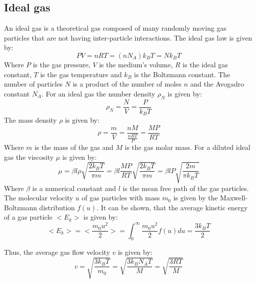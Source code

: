 \documentclass[\main/master.tex]{subfiles}
\begin{document}
\subsection{Ideal gas}
An ideal gas is a theoretical gas composed of many randomly moving gas particles that are not having inter-particle interactions. The ideal gas law is given by:
\begin{equation}
PV = nRT = (n N_A) k_B T = N k_B T  \label{eqn:ideal-gasses}
\end{equation}
Where $P$ is the gas pressure, $V$ is the medium's volume, $R$ is the ideal gas constant, $T$ is the gas temperature and $k_B$ is the Boltzmann constant. The number of particles $N$ is a product of the number of moles $n$ and the Avogadro constant $N_A$. For an ideal gas the number density $\rho_N$ is given by:
\begin{equation}
\rho_N = \frac{N}{V}= \frac{P}{k_B T}    \label{eqn:ideal number density}
\end{equation}
The mass density $\rho$ is given by:
\begin{equation}
\rho = \frac{m}{V}=\frac{n M}{\frac{n R T}{P}}=\frac{MP}{RT}     \label{eqn:ideal density}
\end{equation}
Where $m$ is the mass of the gas and $M$ is the gas molar mass. For a diluted ideal gas the viscosity $\mu$ is given by:
\begin{equation}
\mu = \beta l \rho \sqrt{\frac{2 k_B  T}{\pi m}}  =  \beta l \frac{MP}{RT} \sqrt{\frac{2 k_B  T}{\pi m}} =  \beta l P \sqrt{\frac{2 m  }{\pi k_B T}}     \label{eqn:viscosity}
\end{equation}
Where $\beta$ is a numerical constant and $l$ is the mean free path of the gas particles. The molecular velocity $u$ of gas particles with mass $m_0$ is given by the Maxwell-Boltzmann distribution $f(u)$. It can be shown, that the average kinetic energy of a gas particle $<E_k>$ is given by:
\begin{equation}
<E_k>=<\frac{m_0u^2}{2}> = \int_{0}^{\infty}\frac{m_0 u^2}{2}f(u)du =  \frac{3k_BT}{2}    \label{eqn:average kinetic}
\end{equation}
\par\noindent
Thus, the average gas flow velocity $v$ is given by:
\begin{equation}
v =\sqrt{\frac{3k_B T}{m_0}}=\sqrt{\frac{3 k_B N_A T}{M}} =  \sqrt{\frac{3RT}{M}}   
\label{eqn:flow velocity}
\end{equation}
\end{document}
